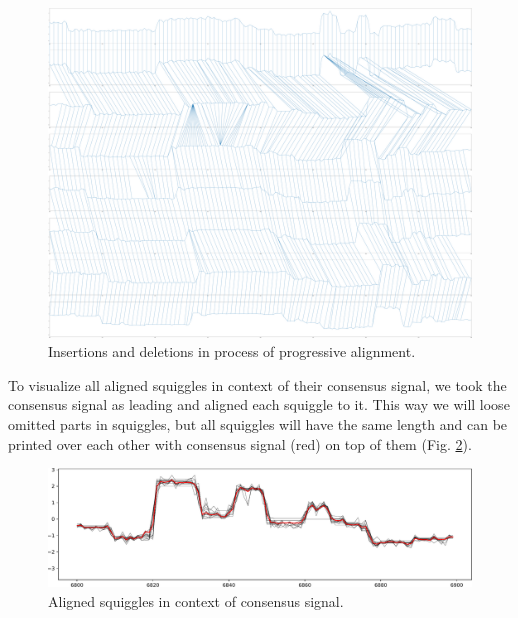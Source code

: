 \begin{figure}[h]
  \centering
  \includegraphics[width=1.0\textwidth]{images/pairings}
  \caption{Insertions and deletions in process of progressive alignment.}
  \label{fig:pairings}
\end{figure}

To visualize all aligned squiggles in context of their consensus signal, we took the consensus signal as leading and aligned each squiggle to it.
This way we will loose omitted parts in squiggles, but all squiggles will have the same length and can be printed over each other with consensus signal (red) on top of them (Fig. \ref{fig:foos}).

\begin{figure}[h]
  \centering
  \includegraphics[width=1.0\textwidth]{images/foos}
  \caption{Aligned squiggles in context of consensus signal.}
  \label{fig:foos}
\end{figure}
